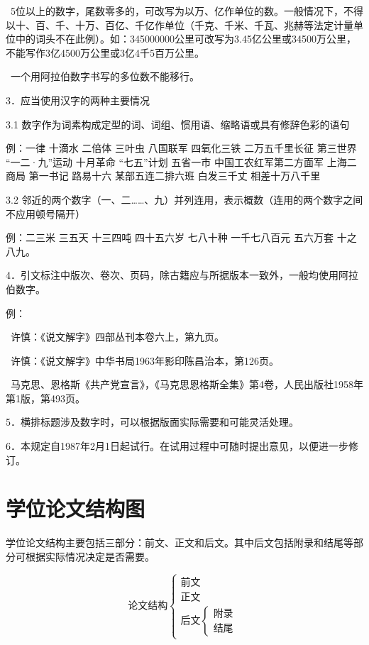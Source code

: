 ~5位以上的数字，尾数零多的，可改写为以万、亿作单位的数。一般情况下，不得以十、百、千、十万、百亿、千亿作单位（千克、千米、千瓦、兆赫等法定计量单位中的词头不在此例）。如：345000000公里可改写为3.45亿公里或34500万公里，不能写作3亿4500万公里或3亿4千5百万公里。

~一个用阿拉伯数字书写的多位数不能移行。

3．应当使用汉字的两种主要情况

3.1  数字作为词素构成定型的词、词组、惯用语、缩略语或具有修辞色彩的语句

例：一律  十滴水  二倍体  三叶虫  八国联军  四氧化三铁  二万五千里长征  第三世界  “一二·九”运动  十月革命  “七五”计划  五省一市  中国工农红军第二方面军  上海二商局 第一书记  路易十六  某部五连二排六班  白发三千丈  相差十万八千里

3.2  邻近的两个数字（一、二……、九）并列连用，表示概数（连用的两个数字之间不应用顿号隔开）

例：二三米  三五天  十三四吨  四十五六岁  七八十种  一千七八百元  五六万套  十之八九。

4．引文标注中版次、卷次、页码，除古籍应与所据版本一致外，一般均使用阿拉伯数字。

例：

~许慎：《说文解字》四部丛刊本卷六上，第九页。

~许慎：《说文解字》中华书局1963年影印陈昌治本，第126页。

~马克思、恩格斯《共产党宣言》，《马克思恩格斯全集》第4卷，人民出版社1958年第1版，第493页。

5．横排标题涉及数字时，可以根据版面实际需要和可能灵活处理。

6．本规定自1987年2月1日起试行。在试用过程中可随时提出意见，以便进一步修订。

\chapter{学位论文结构图}

学位论文结构主要包括三部分：前文、正文和后文。其中后文包括附录和结尾等部分可根据实际情况决定是否需要。

\[
  \text{论文结构}
  \begin{cases}
    \text{前文} \\
    \text{正文} \\
    \text{后文}
    \begin{cases}
      \text{附录} \\
      \text{结尾}
    \end{cases}
  \end{cases}
\]

